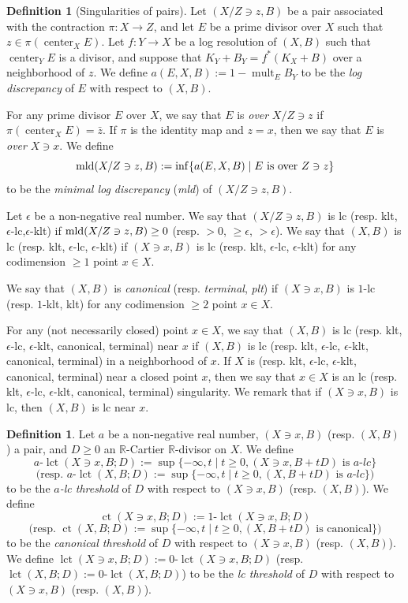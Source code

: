 \documentclass[11pt]{amsart}
\numberwithin{equation}{section}
\newcommand{\Rr}{\mathbb{R}}
\newcommand{\Center}{\operatorname{center}}
\newcommand{\mld}{{\rm{mld}}}
\newcommand{\lct}{\operatorname{lct}}
\newcommand{\ct}{\operatorname{ct}}
\newcommand{\mult}{\operatorname{mult}}
\theoremstyle{definition}
\theoremstyle{definition}
\newtheorem{defn}[thm]{Definition}
\begin{document}
\begin{defn}[Singularities of pairs]\label{defn: relative mld}
 Let $(X/Z\ni z,B)$ be a pair associated with the contraction $\pi: X\to Z$, and let $E$ be a prime divisor over $X$ such that $z\in\pi(\Center_X E)$. Let $f: Y\rightarrow X$ be a log resolution of $(X,B)$ such that $\Center_Y E$ is a divisor, and suppose that $K_Y+B_Y=f^*(K_X+B)$ over a neighborhood of $z$. We define $a(E,X,B):=1-\mult_EB_Y$ to be the \emph{log discrepancy} of $E$ with respect to $(X,B)$. 
 
 For any prime divisor $E$ over $X$, we say that $E$ is \emph{over} $X/Z\ni z$ if $\pi(\Center_X E)=\bar z$. If $\pi$ is the identity map and $z=x$, then we say that $E$
 is \emph{over} $X\ni x$. We define
 $$\mld(X/Z\ni z,B):=\inf\{a(E,X,B)\mid E\text{ is over }Z\ni z\}$$
 to be the \emph{minimal log discrepancy} (\emph{mld}) of $(X/Z\ni z,B)$.
 
 Let $\epsilon$ be a non-negative real number. We say that $(X/Z\ni z,B)$ is lc (resp. klt, $\epsilon$-lc,$\epsilon$-klt) if $\mld(X/Z\ni z,B)\geq 0$ (resp. $>0$, $\geq\epsilon$, $>\epsilon$). We say that $(X,B)$ is lc (resp. klt, $\epsilon$-lc, $\epsilon$-klt) if $(X\ni x,B)$ is lc (resp. klt, $\epsilon$-lc, $\epsilon$-klt) for any codimension $\geq 1$ point $x\in X$. 
 
 We say that $(X,B)$ is \emph{canonical} (resp. \emph{terminal}, \emph{plt}) if $(X\ni x,B)$ is $1$-lc (resp. $1$-klt, klt) for any codimension $\geq 2$ point $x\in X$.%
 
 For any (not necessarily closed) point $x\in X$, we say that $(X,B)$ is lc (resp. klt, $\epsilon$-lc, $\epsilon$-klt, canonical, terminal) near $x$ if $(X,B)$ is lc (resp. klt, $\epsilon$-lc, $\epsilon$-klt, canonical, terminal) in a neighborhood of $x$. If $X$ is (resp. klt, $\epsilon$-lc, $\epsilon$-klt, canonical, terminal) near a closed point $x$, then we say that $x\in X$ is an lc (resp. klt, $\epsilon$-lc, $\epsilon$-klt, canonical, terminal) singularity. We remark that if $(X\ni x, B)$ is lc, then $(X,B)$ is lc near $x$.
\end{defn} 


\begin{defn}\label{defn: alct local}  Let $a$ be a non-negative real number, $(X\ni x,B)$ (resp. $(X,B)$) a pair, and $D\geq 0$ an $\Rr$-Cartier $\Rr$-divisor on $X$. We define
$$a\text{-}\lct(X\ni x,B;D):=\sup\{-\infty,t\mid t\geq 0, (X\ni x,B+tD)\text{ is }a\text{-}lc\}$$
$$\text{(resp. }a\text{-}\lct(X,B;D):=\sup\{-\infty,t\mid t\geq 0, (X,B+tD)\text{ is }a\text{-}lc\} \text{)}$$
to be the \emph{$a$-lc threshold} of $D$ with respect to $(X\ni x,B)$ (resp. $(X,B)$). We define
$$\ct(X\ni x,B;D):=1\text{-}\lct(X\ni x,B;D)$$
$$\text{(resp. }\ct(X,B;D):=\sup\{-\infty,t\mid t\geq 0, (X,B+tD)\text{ is canonical}\} \text{)}$$
to be the \emph{canonical threshold} of $D$ with respect to $(X\ni x,B)$ (resp. $(X,B)$). We define $\lct(X\ni x,B;D):=0\text{-}\lct(X\ni x,B;D)$ (resp. $\lct(X,B;D):=0\text{-}\lct(X,B;D)$) to be the \emph{lc threshold} of $D$ with respect to $(X\ni x,B)$ (resp. $(X,B)$).
\end{defn}
\end{document}

